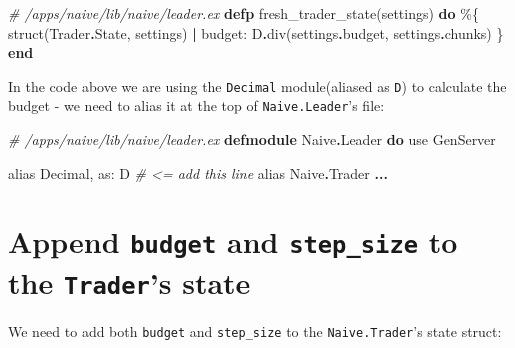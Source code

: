 \documentclass[
]{book}
\newenvironment{Shaded}{\begin{snugshade}}{\end{snugshade}}
\newcommand{\CommentTok}[1]{\textcolor[rgb]{0.56,0.35,0.01}{\textit{#1}}}
\newcommand{\ConstantTok}[1]{\textcolor[rgb]{0.00,0.00,0.00}{#1}}
\newcommand{\ImportTok}[1]{#1}
\newcommand{\KeywordTok}[1]{\textcolor[rgb]{0.13,0.29,0.53}{\textbf{#1}}}
\newcommand{\NormalTok}[1]{#1}
\newcommand{\OperatorTok}[1]{\textcolor[rgb]{0.81,0.36,0.00}{\textbf{#1}}}
\newcommand{\VariableTok}[1]{\textcolor[rgb]{0.00,0.00,0.00}{#1}}
\begin{document}
\begin{Shaded}
\begin{Highlighting}[]
  \CommentTok{\# /apps/naive/lib/naive/leader.ex}
  \KeywordTok{defp}\NormalTok{ fresh\_trader\_state(settings) }\KeywordTok{do}
\NormalTok{    \%\{}
\NormalTok{      struct(}\ConstantTok{Trader}\OperatorTok{.}\ConstantTok{State}\NormalTok{, settings) }\OperatorTok{|}
      \VariableTok{budget:}\NormalTok{ D}\OperatorTok{.}\NormalTok{div(settings}\OperatorTok{.}\NormalTok{budget, settings}\OperatorTok{.}\NormalTok{chunks)}
\NormalTok{    \}}
  \KeywordTok{end}
\end{Highlighting}
\end{Shaded}

In the code above we are using the \texttt{Decimal} module(aliased as \texttt{D}) to calculate the budget - we need to alias it at the top of \texttt{Naive.Leader}'s file:

\begin{Shaded}
\begin{Highlighting}[]
\CommentTok{\# /apps/naive/lib/naive/leader.ex}
\KeywordTok{defmodule} \ConstantTok{Naive}\OperatorTok{.}\ConstantTok{Leader} \KeywordTok{do}
  \ImportTok{use} \ConstantTok{GenServer}

  \ImportTok{alias} \ConstantTok{Decimal}\NormalTok{, }\VariableTok{as:}\NormalTok{ D }\CommentTok{\# \textless{}= add this line}
  \ImportTok{alias} \ConstantTok{Naive}\OperatorTok{.}\ConstantTok{Trader}
  \OperatorTok{...}
\end{Highlighting}
\end{Shaded}

\hypertarget{append-budget-and-step_size-to-the-traders-state}{%
\section{\texorpdfstring{Append \texttt{budget} and \texttt{step\_size} to the \texttt{Trader}'s state}{Append budget and step\_size to the Trader's state}}\label{append-budget-and-step_size-to-the-traders-state}}

We need to add both \texttt{budget} and \texttt{step\_size} to the \texttt{Naive.Trader}'s state struct:
\end{document}
